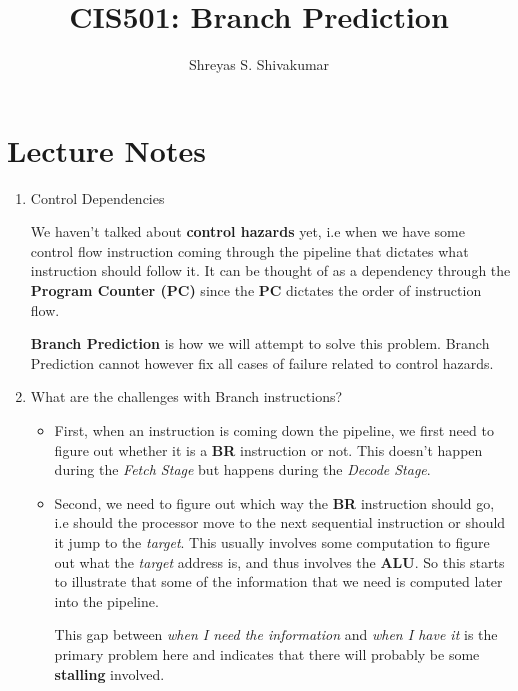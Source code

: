 \documentclass[12pt]{article}
\title{CIS501: Branch Prediction}
\author[1]{Shreyas S. Shivakumar}
\newenvironment{QandA}{\begin{enumerate}[label=\bfseries\arabic*.]\bfseries}
                      {\end{enumerate}}
\newenvironment{answered}{\par\quad\normalfont}{}
\begin{document}
\maketitle

\section{Lecture Notes}

\begin{QandA}
\item Control Dependencies
\begin{answered}
    We haven't talked about \textbf{control hazards} yet, i.e when we have some control flow instruction coming through the pipeline that dictates what instruction should follow it. It can be thought of as a dependency through the \textbf{Program Counter (PC)} since the \textbf{PC} dictates the order of instruction flow. 
    
    \qquad\textbf{Branch Prediction} is how we will attempt to solve this problem. Branch Prediction cannot however fix all cases of failure related to control hazards. 
\end{answered}

\item What are the challenges with Branch instructions?
\vspace{-0.85cm}
\begin{answered}
\begin{itemize}
    \item First, when an instruction is coming down the pipeline, we first need to figure out whether it is a \textbf{BR} instruction or not. This doesn't happen during the \textit{Fetch Stage} but happens during the \textit{Decode Stage}.
    
    \item Second, we need to figure out which way the \textbf{BR} instruction should go, i.e should the processor move to the next sequential instruction or should it jump to the \textit{target}. This usually involves some computation to figure out what the \textit{target} address is, and thus involves the \textbf{ALU}. So this starts to illustrate that some of the information that we need is computed later into the pipeline.
    
    This gap between \textit{when I need the information} and \textit{when I have it} is the primary problem here and indicates that there will probably be some \textbf{stalling} involved.
    

\end{itemize}
\end{answered}
\end{QandA}
\end{document}
